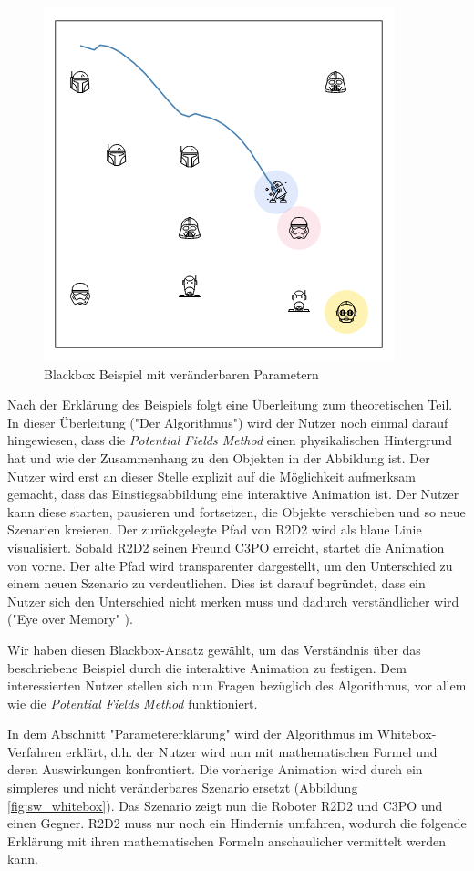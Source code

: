 \begin{figure}[h!]
  \centering
  \includegraphics[width=0.7\linewidth, height=0.7\linewidth]{img/sim2.png}
  \caption{Blackbox Beispiel mit veränderbaren Parametern}
  \label{fig:sw_blackbox}
\end{figure}

Nach der Erklärung des Beispiels folgt eine Überleitung zum theoretischen Teil. In dieser Überleitung ("Der Algorithmus") wird der Nutzer noch einmal darauf hingewiesen, dass die \textit{Potential Fields Method} einen physikalischen Hintergrund hat und wie der Zusammenhang zu den Objekten in der Abbildung ist.
Der Nutzer wird erst an dieser Stelle explizit auf die Möglichkeit aufmerksam gemacht, dass das Einstiegsabbildung eine interaktive Animation ist. Der Nutzer kann diese starten, pausieren und fortsetzen, die Objekte verschieben und so neue Szenarien kreieren. Der zurückgelegte Pfad von R2D2 wird als blaue Linie visualisiert. Sobald R2D2 seinen Freund C3PO erreicht, startet die Animation von vorne. Der alte Pfad wird transparenter dargestellt, um den Unterschied zu einem neuen Szenario zu verdeutlichen. Dies ist darauf begründet, dass ein Nutzer sich den Unterschied nicht merken muss und dadurch verständlicher wird ("Eye over Memory" \cite{munzner2015visualization}).

Wir haben diesen Blackbox-Ansatz gewählt, um das Verständnis über das beschriebene Beispiel durch die interaktive Animation zu festigen. Dem interessierten Nutzer stellen sich nun Fragen bezüglich des Algorithmus, vor allem wie die \textit{Potential Fields Method} funktioniert.

In dem Abschnitt "Parametererklärung" wird der Algorithmus im Whitebox-Verfahren erklärt, d.h. der Nutzer wird nun mit mathematischen Formel und deren Auswirkungen konfrontiert. Die vorherige Animation wird durch ein simpleres und nicht veränderbares Szenario ersetzt (Abbildung \ref{fig:sw_whitebox}). 
Das Szenario zeigt nun die Roboter R2D2 und C3PO und einen Gegner. R2D2 muss nur noch ein Hindernis umfahren, wodurch die folgende Erklärung mit ihren mathematischen Formeln anschaulicher vermittelt werden kann.

